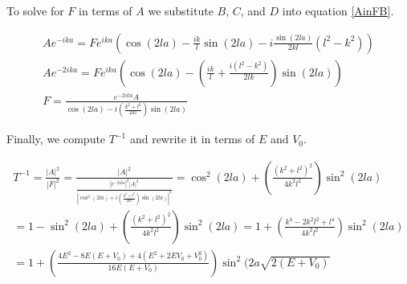 \documentclass[letterpaper,12pt]{article}
\begin{document}
    To solve for $F$ in terms of $A$ we substitute $B$, $C$, and $D$ into
    equation \eqref{AinFB}.

    \begin{gather*}
        Ae^{-ika}
        = Fe^{ika}
        \left(
        \cos(2la) - \frac{ik}{l}\sin(2la)
        - i\frac{\sin(2la)}{2kl}(l^2 - k^2)
        \right)
        \\
        Ae^{-2ika}
        = Fe^{ika}
        \left(
        \cos(2la) -
        \left(
        \frac{ik}{l} + \frac{i(l^2 - k^2)}{2lk}
        \right)
        \sin(2la)
        \right)
        \\
        F = \frac{e^{-2ika}A}{\cos(2la) - i
        \left(
        \frac{k^2 + l^2}{2kl}
        \right)
        \sin(2la)}
    \end{gather*}

    \pagebreak

    Finally, we compute $T^{-1}$ and rewrite it in terms of $E$ and $V_0$.

    \begin{gather*}
        T^{-1} = \frac{\left| A \right| ^{2}}{\left| F \right| ^{2}}
        = \frac{\left| A \right| ^{2}}{
            \frac{\left| e^{-2ika} \right| ^2 \left| A \right | ^2}{
                    \left|
                    \cos^2(2la) + i \left( \frac{k^2 + l^2}{2kl} \right)
                    \sin(2la)
                    \right| ^2
                }
            }
        = \cos^2(2la) + \left( \frac{(k^2 + l^2)^2}{4k^2l^2} \right) \sin^2(2la)
        \\
        = 1 - \sin^2(2la) + \left( \frac{(k^2 + l^2)^2}{4k^2l^2}
        \right) \sin^2(2la)
        = 1 + \left( \frac{k^4 - 2k^2l^2 + l^4}{4k^2l^2} \right) \sin^2(2la)
        \\
        = 1 + \left( \frac{4E^2 - 8E(E + V_0) + 4(E^2 + 2EV_0 + V_0^2)}
        {16E(E + V_0)} \right) \sin^2(2a\sqrt{2(E + V_0)}
    \end{gather*}

    \begin{center}
    \end{center}
\end{document}
